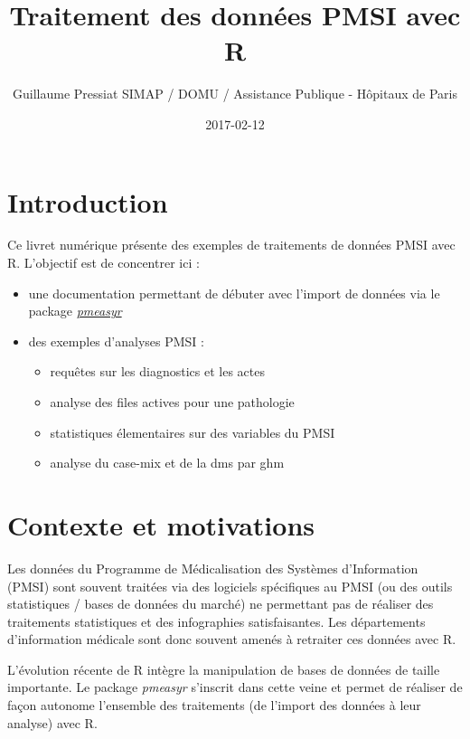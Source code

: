 \documentclass[]{book}
\title{Traitement des données PMSI avec R}
\author{Guillaume Pressiat \textbar{}\textbar{} SIMAP / DOMU / Assistance
Publique - Hôpitaux de Paris}
\date{2017-02-12}
\providecommand{\tightlist}{%
  \setlength{\itemsep}{0pt}\setlength{\parskip}{0pt}}
\begin{document}
\maketitle

{
\setcounter{tocdepth}{1}
\tableofcontents
}
\chapter{Introduction}\label{introduction}

Ce livret numérique présente des exemples de traitements de données PMSI
avec R. L'objectif est de concentrer ici :

\begin{itemize}
\item
  une documentation permettant de débuter avec l'import de données via
  le package \href{https://github.com/IM-APHP/pmeasyr}{\emph{pmeasyr}}
\item
  des exemples d'analyses PMSI :

  \begin{itemize}
  \tightlist
  \item
    requêtes sur les diagnostics et les actes
  \item
    analyse des files actives pour une pathologie
  \item
    statistiques élementaires sur des variables du PMSI
  \item
    analyse du case-mix et de la dms par ghm
  \end{itemize}
\end{itemize}

\chapter{Contexte et motivations}\label{contexte}

Les données du Programme de Médicalisation des Systèmes d'Information
(PMSI) sont souvent traitées via des logiciels spécifiques au PMSI (ou
des outils statistiques / bases de données du marché) ne permettant pas
de réaliser des traitements statistiques et des infographies
satisfaisantes. Les départements d'information médicale sont donc
souvent amenés à retraiter ces données avec R.

L'évolution récente de R intègre la manipulation de bases de données de
taille importante. Le package \emph{pmeasyr} s'inscrit dans cette veine
et permet de réaliser de façon autonome l'ensemble des traitements (de
l'import des données à leur analyse) avec R.
\end{document}

